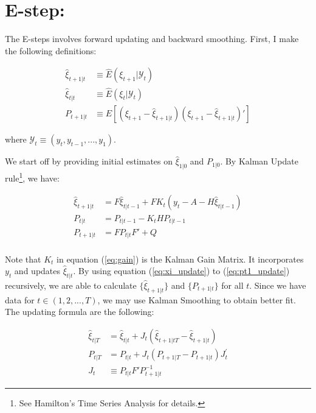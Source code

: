 \documentclass[12pt]{article}
\numberwithin{equation}{section}
\begin{document}
\section{E-step:} \label{sec:E}

The E-steps involves forward updating and backward smoothing. First, I make the following definitions:

\begin{align*}
    \hat{\xi}_{t+1|t} & \equiv \hat{E}(\xi_{t+1}|\mathcal{Y}_t) \\
    \hat{\xi}_{t|t} & \equiv \hat{E}(\xi_{t}|\mathcal{Y}_t) \\
    P_{t+1|t} & \equiv E[(\xi_{t+1} - \hat{\xi}_{t+1|t})(\xi_{t+1} - \hat{\xi}_{t+1|t})']
\end{align*}

where $\mathcal{Y}_t\equiv(y_t,y_{t-1},...,y_1)$. 

We start off by providing initial estimates on $\hat{\xi}_{1|0}$ and $P_{1|0}$. By Kalman Update rule\footnote{See Hamilton's Time Series Analysis for details.}, we have:

\begin{align}
    \hat{\xi}_{t+1|t} & = F\hat{\xi}_{t|t-1} + FK_t(y_t - A - H\hat{\xi}_{t|t-1}) \label{eq:xi_update} \\
    P_{t|t} & = P_{t|t-1} - K_tHP_{t|t-1} \label{eq:p_update} \\
    P_{t+1|t} & = FP_{t|t}F'+Q \label{eq:pt1_update} \\
\end{align}

Note that $K_t$ in equation (\ref{eq:gain}) is the Kalman Gain Matrix. It incorporates $y_t$ and updates $\hat{\xi}_{t|t}$. By using equation (\ref{eq:xi_update}) to (\ref{eq:pt1_update}) recursively, we are able to calculate $\{\hat{\xi}_{t+1|t}\}$ and $\{P_{t+1|t}\}$ for all $t$. 
Since we have data for $t \in (1,2,...,T)$, we may use Kalman Smoothing to obtain better fit. The updating formula are the following:

\begin{align}
    \hat{\xi}_{t|T} & = \hat{\xi}_{t|t} + J_t(\hat{\xi}_{t+1|tT} - \hat{\xi}_{t+1|t}) \label{eq:xi_smooth} \\
    P_{t|T} & = P_{t|t} + J_{t}(P_{t+1|T} - P_{t+1|t})J_{t}^{'} \label{eq:p_smooth} \\
    J_t & \equiv P_{t|t}F'P_{t+1|t}^{-1} \label{eq:back_smooth}
\end{align}
\end{document}

